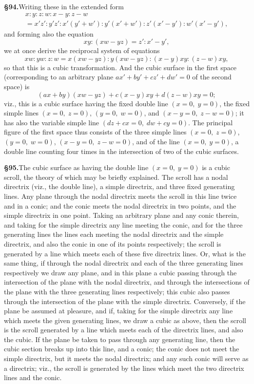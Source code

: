 \documentclass[11pt,a4paper]{article}
\begin{document}
\textbf{\S 94.}\quad Writing these in the extended form
\begin{multline*}
x : y : z : w : x - y : z - w \\
= x'z' : y'z' : x'(y' + w') : y'(x' + w') : z'(x' - y') : w'(x' - y'),
\end{multline*}
and forming also the equation
\[
xy : (xw - yz) = z' : x' - y',
\]
we at once derive the reciprocal system of equations
\[
xw : yw : z : w = x(xw - yz) : y(xw - yz) : (x - y)xy : (z - w)xy,
\]
so that this is a cubic transformation. And the cubic surface in the first space (corresponding to an arbitrary plane $ax' + by' + cz' + dw' = 0$ of the second space) is
\[
(ax + by)(xw - yz) + c(x - y)xy + d(z - w)xy = 0;
\]
viz., this is a cubic surface having the fixed double line $(x = 0,\; y = 0)$, the fixed simple lines $(x = 0,\; z = 0)$, $(y = 0,\; w = 0)$, and $(x - y = 0,\; z - w = 0)$; it has also the variable simple line $(dz + cx = 0,\; dw + cy = 0)$. The principal figure of the first space thus consists of the three simple lines $(x = 0,\; z = 0)$, $(y = 0,\; w = 0)$, $(x - y = 0,\; z - w = 0)$, and of the line $(x = 0,\; y = 0)$, a double line counting four times in the intersection of two of the cubic surfaces.

\textbf{\S 95.}\quad The cubic surface as having the double line $(x = 0,\; y = 0)$ is a cubic scroll, the theory of which may be briefly explained. The scroll has a nodal directrix (viz., the double line), a simple directrix, and three fixed generating lines. Any plane through the nodal directrix meets the scroll in this line twice and in a conic; and the conic meets the nodal directrix in two points, and the simple directrix in one point. Taking an arbitrary plane and any conic therein, and taking for the simple directrix any line meeting the conic, and for the three generating lines the lines each meeting the nodal directrix and the simple directrix, and also the conic in one of its points respectively; the scroll is generated by a line which meets each of these five directrix lines. Or, what is the same thing, if through the nodal directrix and each of the three generating lines respectively we draw any plane, and in this plane a cubic passing through the intersection of the plane with the nodal directrix, and through the intersections of the plane with the three generating lines respectively; this cubic also passes through the intersection of the plane with the simple directrix. Conversely, if the plane be assumed at pleasure, and if, taking for the simple directrix any line which meets the given generating lines, we draw a cubic as above, then the scroll is the scroll generated by a line which meets each of the directrix lines, and also the cubic. If the plane be taken to pass through any generating line, then the cubic section breaks up into this line, and a conic; the conic does not meet the simple directrix, but it meets the nodal directrix; and any such conic will serve as a directrix; viz., the scroll is generated by the lines which meet the two directrix lines and the conic.
\end{document}

